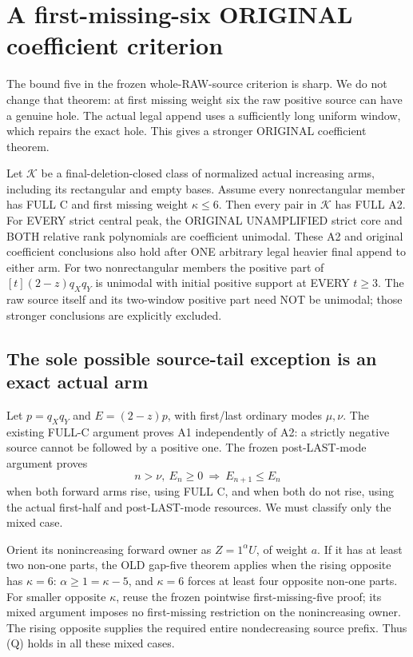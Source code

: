 \section{A first-missing-six ORIGINAL coefficient criterion}
The bound five in the frozen whole-RAW-source criterion is sharp.
We do not change that theorem: at first missing weight six the
raw positive source can have a genuine hole. The actual legal
append uses a sufficiently long uniform window, which repairs
the exact hole. This gives a stronger ORIGINAL coefficient theorem.

\begin{theorem}
Let $\mathcal K$ be a final-deletion-closed class of normalized
actual increasing arms, including its rectangular and empty bases.
Assume every nonrectangular member has FULL C and first missing
weight $\kappa\le6$. Then every pair in $\mathcal K$ has FULL A2.
For EVERY strict central peak, the ORIGINAL UNAMPLIFIED strict
core and BOTH relative rank polynomials are coefficient unimodal.
These A2 and original coefficient conclusions also hold after
ONE arbitrary legal heavier final append to either arm.
For two nonrectangular members the positive part of $[t](2-z)q_Xq_Y$
is unimodal with initial positive support at EVERY $t\ge3$.
The raw source itself and its two-window positive part need NOT
be unimodal; those stronger conclusions are explicitly excluded.
\end{theorem}

\subsection{The sole possible source-tail exception is an exact actual arm}
Let $p=q_Xq_Y$ and $E=(2-z)p$, with first/last ordinary modes
$\mu,\nu$. The existing FULL-C argument proves A1 independently
of A2: a strictly negative source cannot be followed by a positive
one. The frozen post-LAST-mode argument proves
\[
       n>\nu,\ E_n\ge0\ \Longrightarrow\ E_{n+1}\le E_n             \tag{Q}
\]
when both forward arms rise, using FULL C, and when both do not
rise, using the actual first-half and post-LAST-mode resources.
We must classify only the mixed case.

Orient its nonincreasing forward owner as $Z=1^\alpha U$, of
weight $a$. If it has at least two non-one parts, the OLD gap-five
theorem applies when the rising opposite has $\kappa=6$:
$\alpha\ge1=\kappa-5$, and $\kappa=6$ forces at least four
opposite non-one parts. For smaller opposite $\kappa$, reuse
the frozen pointwise first-missing-five proof; its mixed argument
imposes no first-missing restriction on the nonincreasing owner.
The rising opposite supplies the required entire nondecreasing
source prefix. Thus (Q) holds in all these mixed cases.


